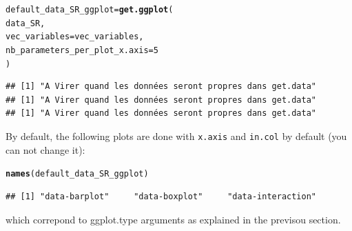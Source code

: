 \documentclass{article}\usepackage[]{graphicx}\usepackage[]{color}
\makeatletter
\newcommand{\hlnum}[1]{\textcolor[rgb]{0.686,0.059,0.569}{#1}}%
\newcommand{\hlstd}[1]{\textcolor[rgb]{0.345,0.345,0.345}{#1}}%
\newcommand{\hlkwb}[1]{\textcolor[rgb]{0.69,0.353,0.396}{#1}}%
\newcommand{\hlkwc}[1]{\textcolor[rgb]{0.333,0.667,0.333}{#1}}%
\newcommand{\hlkwd}[1]{\textcolor[rgb]{0.737,0.353,0.396}{\textbf{#1}}}%
\newenvironment{kframe}{%
 \def\at@end@of@kframe{}%
 \ifinner\ifhmode%
  \def\at@end@of@kframe{\end{minipage}}%
  \begin{minipage}{\columnwidth}%
 \fi\fi%
 \def\FrameCommand##1{\hskip\@totalleftmargin \hskip-\fboxsep
 \colorbox{shadecolor}{##1}\hskip-\fboxsep
     \hskip-\linewidth \hskip-\@totalleftmargin \hskip\columnwidth}%
 \MakeFramed {\advance\hsize-\width
   \@totalleftmargin\z@ \linewidth\hsize
   \@setminipage}}%
 {\par\unskip\endMakeFramed%
 \at@end@of@kframe}
\newenvironment{knitrout}{}{} %
\makeatother
\begin{document}
\begin{knitrout}
\color{fgcolor}\begin{kframe}
\begin{alltt}
\hlstd{default_data_SR_ggplot} \hlkwb{=} \hlkwd{get.ggplot}\hlstd{(}
        \hlstd{data_SR,}
        \hlkwc{vec_variables} \hlstd{= vec_variables,}
        \hlkwc{nb_parameters_per_plot_x.axis} \hlstd{=} \hlnum{5}
        \hlstd{)}
\end{alltt}


{\ttfamily\noindent\itshape{}}\begin{verbatim}
## [1] "A Virer quand les données seront propres dans get.data"
## [1] "A Virer quand les données seront propres dans get.data"
## [1] "A Virer quand les données seront propres dans get.data"
\end{verbatim}
\end{kframe}
\end{knitrout}

By default, the following plots are done with \texttt{x.axis} and \texttt{in.col} by default (you can not change it):

\begin{knitrout}
\color{fgcolor}\begin{kframe}
\begin{alltt}
\hlkwd{names}\hlstd{(default_data_SR_ggplot)}
\end{alltt}
\begin{verbatim}
## [1] "data-barplot"     "data-boxplot"     "data-interaction"
\end{verbatim}
\end{kframe}
\end{knitrout}

which correpond to ggplot.type arguments as explained in the previsou section.
\end{document}
